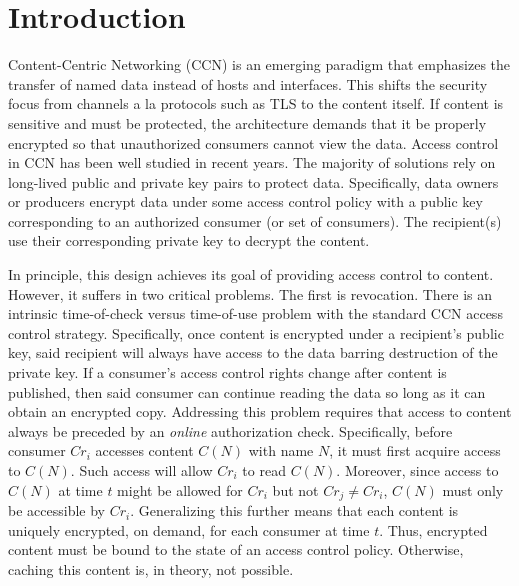 \section{Introduction}
Content-Centric Networking (CCN) is an emerging paradigm that emphasizes the transfer
of named data instead of hosts and interfaces. This shifts the security focus from
channels a la protocols such as TLS to the content itself. If content is sensitive
and must be protected, the architecture demands that it be properly encrypted so
that unauthorized consumers cannot view the data. Access control in CCN has been
well studied in recent years. The majority of solutions rely on long-lived public
and private key pairs to protect data. Specifically, data owners or producers
encrypt data under some access control policy with a public key corresponding to
an authorized consumer (or set of consumers). The recipient(s) use their
corresponding private key to decrypt the content.

In principle, this design achieves its goal of providing access control to content.
However, it suffers in two critical problems. The first is revocation. There is an
intrinsic time-of-check versus time-of-use problem with the standard CCN access
control strategy. Specifically, once content is encrypted under a recipient’s
public key, said recipient will always have access to the data barring destruction
of the private key. If a consumer’s access control rights change after content
is published, then said consumer can continue reading the data so long as it can
obtain an encrypted copy. Addressing this problem requires that access to content
always be preceded by an \emph{online} authorization check. Specifically, before
consumer $Cr_i$ accesses content $C(N)$ with name $N$, it must first acquire access
to $C(N)$. Such access will allow $Cr_i$ to read $C(N)$. Moreover, since access to
$C(N)$ at time $t$ might be allowed for $Cr_i$ but not $Cr_j \not= Cr_i$, $C(N)$ must
only be accessible by $Cr_i$. Generalizing this further means that each content is
uniquely encrypted, on demand, for each consumer at time $t$. Thus, encrypted content
must be bound to the state of an access control policy. Otherwise, caching this
content is, in theory, not possible.

